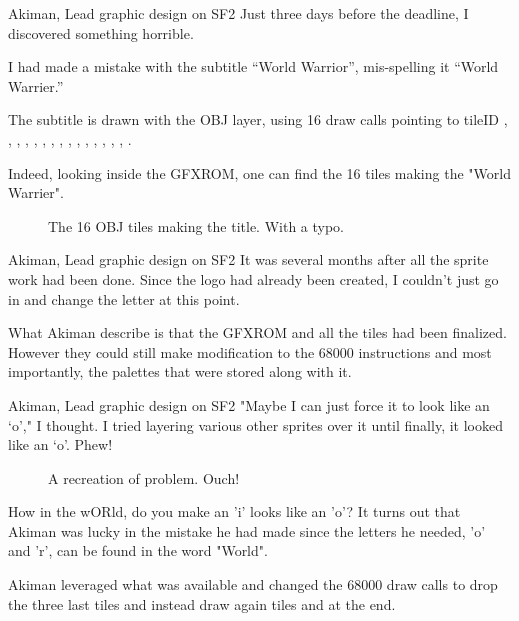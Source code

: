 \begin{q}{Akiman, Lead graphic design on SF2}
Just three days before the deadline, I discovered something horrible. 

I had made a mistake with the subtitle “World Warrior”, mis-spelling it “World Warrier.”
\end{q}

The subtitle is drawn with the OBJ layer, using 16 draw calls pointing to tileID , , , , , , , , , , , , , , , . 

Indeed, looking inside the GFXROM, one can find the 16 tiles making the "World Warrier". 

\begin{figure}[H]
 \caption*{The 16 OBJ tiles making the title. With a typo.}%
 \end{figure}%

\begin{q}{Akiman, Lead graphic design on SF2}
It was several months after all the sprite work had been done. Since the logo had already been created, I couldn't just go in and change the letter at this point.
\end{q}

What Akiman describe is that the GFXROM and all the tiles had been finalized. However they could still make modification to the 68000 instructions and most importantly, the palettes that were stored along with it.

\begin{q}{Akiman, Lead graphic design on SF2}
"Maybe I can just force it to look like an ‘o’," I thought. I tried layering various other sprites over it until finally, it looked like an ‘o’. Phew!
\end{q}

\begin{figure}[H]
 \caption*{A recreation of problem. Ouch!}%
 \end{figure}%



How in the wORld, do you make an 'i' looks like an 'o'? It turns out that Akiman was lucky in the mistake he had made since the letters he needed, 'o' and 'r', can be found in the word "World".

Akiman leveraged what was available and changed the 68000 draw calls to drop the three last tiles and instead draw again tiles  and  at the end.


